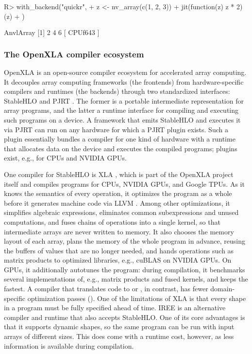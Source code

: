 \documentclass[article,shortnames]{jss}
\renewenvironment{CodeChunk}{\par\addvspace{0.6\baselineskip}\noindent\begin{minipage}{\linewidth}}{\end{minipage}\par\vspace{0.6\baselineskip}}
\begin{document}
\begin{CodeChunk}
\begin{CodeInput}
R> with_backend("quickr", {
+    z <- nv_array(c(1, 2, 3))
+    jit(function(z) z * 2)(z)
+  })
\end{CodeInput}
\begin{CodeOutput}
AnvlArray
[1] 2 4 6
[ CPUf64{3} ]
\end{CodeOutput}
\end{CodeChunk}


\subsubsection{The OpenXLA compiler ecosystem}\label{background}

OpenXLA \citep{ref-openxla} is an open-source compiler ecosystem for accelerated array computing.
It decouples array computing frameworks (the frontends) from hardware-specific compilers and runtimes (the backends) through two standardized interfaces: StableHLO \citep{ref-stablehlo} and PJRT \citep{ref-pjrt}.
The former is a portable intermediate representation for array programs, and the latter a runtime interface for compiling and executing such programs on a device.
A framework that emits StableHLO and executes it via PJRT can run on any hardware for which a PJRT plugin exists.
Such a plugin essentially bundles a compiler for one kind of hardware with a runtime that allocates data on the device and executes the compiled programs; plugins exist, e.g., for CPUs and NVIDIA GPUs.

One compiler for StableHLO is XLA \citep{ref-xla}, which is part of the OpenXLA project itself and compiles programs for CPUs, NVIDIA GPUs, and Google TPUs.
As it knows the semantics of every operation, it optimizes the program as a whole before it generates machine code via LLVM \citep{ref-llvm}.
Among other optimizations, it simplifies algebraic expressions, eliminates common subexpressions and unused computations, and fuses chains of operations into a single kernel, so that intermediate arrays are never written to memory.
It also chooses the memory layout of each array, plans the memory of the whole program in advance, reusing the buffers of values that are no longer needed, and hands operations such as matrix products to optimized libraries, e.g., cuBLAS on NVIDIA GPUs.
On GPUs, it additionally autotunes the program: during compilation, it benchmarks several implementations of, e.g., matrix products and fused kernels, and keeps the fastest.
A compiler that translates  code to  or , in contrast, has fewer domain-specific optimization passes ().
One of the limitations of XLA is that every shape in a program must be fully specified ahead of time.
IREE \citep{ref-iree} is an alternative compiler and runtime that also accepts StableHLO.
One of its core advantages is that it supports dynamic shapes, so the same program can be run with input arrays of different sizes.
This does come with a runtime cost, however, as less information is available during compilation.
\end{document}
